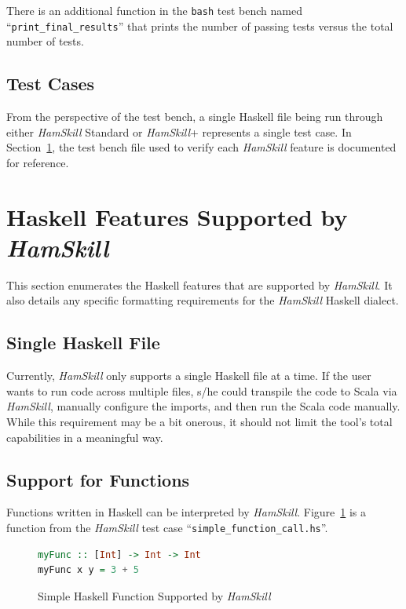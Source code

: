 \documentclass{report}
\begin{document}
There is an additional function in the \texttt{bash} test bench named ``\texttt{print\_final\_results}'' that prints the number of passing tests versus the total number of tests.

\subsection{Test Cases}

From the perspective of the test bench, a single Haskell file being run through either \textit{HamSkill} Standard or \textit{HamSkill}+ represents a single test case.  In Section~\ref{sec:hamskillFeatures}, the test bench file used to verify each \textit{HamSkill} feature is documented for reference.

\section{Haskell Features Supported by \textit{HamSkill}}\label{sec:hamskillFeatures}

This section enumerates the Haskell features that are supported by \textit{HamSkill}.  It also details any specific formatting requirements for the \textit{HamSkill} Haskell dialect.

\subsection{Single Haskell File}

Currently, \textit{HamSkill} only supports a single Haskell file at a time.  If the user wants to run code across multiple files, s/he could transpile the code to Scala via \textit{HamSkill}, manually configure the imports, and then run the Scala code manually.  While this requirement may be a bit onerous, it should not limit the tool's total capabilities in a meaningful way.

\subsection{Support for Functions}

Functions written in Haskell can be interpreted by \textit{HamSkill}.  Figure~\ref{fig:myFunctionHaskell} is a function from the \textit{HamSkill} test case ``\texttt{simple\_function\_call.hs}''.

\begin{figure}[H]
\begin{mdframed}
\begin{lstlisting}[language=Haskell]
myFunc :: [Int] -> Int -> Int
myFunc x y = 3 + 5
\end{lstlisting}
\end{mdframed}
\caption{Simple Haskell Function Supported by \textit{HamSkill}}\label{fig:myFunctionHaskell}
\end{figure}
\end{document}
